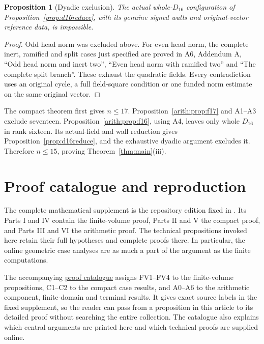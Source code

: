 \documentclass[11pt]{article}
\newtheorem{proposition}[theorem]{Proposition}
\theoremstyle{remark}\newtheorem{remark}[theorem]{Remark}
\numberwithin{equation}{section}
\begin{document}
\begin{proposition}[Dyadic exclusion]\label{arith:prop:noD16}\label{prop:dyadic}
The actual whole-$D_{16}$ configuration of Proposition~\ref{prop:d16reduce},
with its genuine signed walls and original-vector reference data, is
impossible.
\end{proposition}
\begin{proof}
Odd head norm was excluded above. For even head norm, the complete inert,
ramified and split cases just specified are proved in A6, Addendum A,
``Odd head norm and inert two'', ``Even head norm with ramified two''
and ``The complete split branch''. These exhaust the quadratic fields.
Every contradiction uses an original cycle, a full field-square condition
or one funded norm estimate on the same original vector.
\end{proof}

The compact theorem first gives $n\le17$. Proposition~\ref{arith:prop:f17}
and A1--A3 exclude seventeen. Proposition~\ref{arith:prop:f16}, using A4,
leaves only whole $D_{16}$ in rank sixteen. Its actual-field and wall
reduction gives Proposition~\ref{prop:d16reduce}, and the exhaustive
dyadic argument excludes it. Therefore $n\le15$, proving
Theorem~\ref{thm:main}(iii).

\section{Proof catalogue and reproduction}\label{sec:reproduction}
The complete mathematical supplement is the repository edition fixed in
\cite{Addenda}. Its Parts I and IV contain the finite-volume proof, Parts II
and V the compact proof, and Parts III and VI the arithmetic proof. The
technical propositions invoked here retain their full hypotheses and
complete proofs there. In particular, the online geometric case analyses
are as much a part of the argument as the finite computations.

The accompanying
\href{https://github.com/sashakolpakov/CoxeterPolytopes/blob/main/arxiv/hyperbolic_coxeter_dimension_bounds/ADDENDA.md}{proof catalogue}
assigns FV1--FV4 to the finite-volume propositions, C1--C2 to the compact
case results, and A0--A6 to the arithmetic component, finite-domain and
terminal results. It gives exact source labels in the fixed supplement,
so the reader can pass from a proposition in this article to its detailed
proof without searching the entire collection. The catalogue also explains
which central arguments are printed here and which technical proofs are
supplied online.
\end{document}
